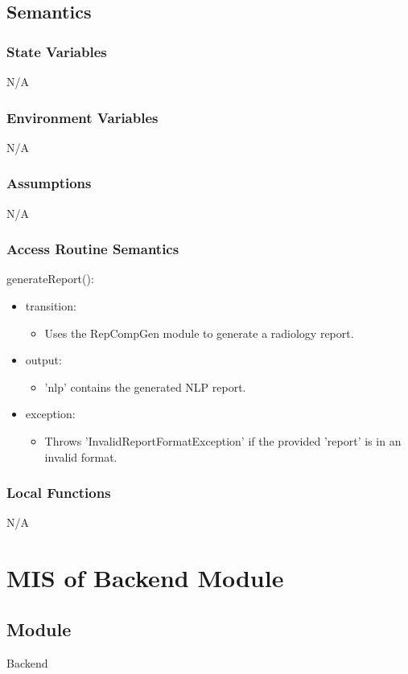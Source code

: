 \documentclass[12pt, titlepage]{article}
\begin{document}
\subsection{Semantics}

\subsubsection{State Variables}
N/A
\subsubsection{Environment Variables}
N/A
\subsubsection{Assumptions}
N/A
\subsubsection{Access Routine Semantics}

\noindent generateReport():
\begin{itemize}
\item transition: \begin{itemize}
    \item Uses the RepCompGen module to generate a radiology report.
\end{itemize}
\item output: \begin{itemize}
    \item 'nlp' contains the generated NLP report.
\end{itemize}
\item exception: \begin{itemize}
    \item Throws 'InvalidReportFormatException' if the provided 'report' is in an invalid format.
\end{itemize}
\end{itemize}

\subsubsection{Local Functions}
N/A
\newpage

\section{MIS of Backend Module} \label{Module} 
\subsection{Module}
Backend
\end{document}
